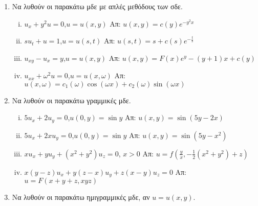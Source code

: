 


\thispagestyle{empty}



\begin{center}
\end{center}

\vspace{\baselineskip}

\begin{enumerate}
  \item Να λυθούν οι παρακάτω μδε με απλές μεθόδους των σδε.
    \begin{enumerate}[i)]
      \item $u_{x}+y^{2}u=0$,\quad $u=u(x,y)$ \hfill Απ: $u(x,y)=c(y)e^{-y^{2}x}$
      \item $su_{t}+u=1$,\quad $u=u(s,t)$ \hfill Απ: $u(s,t)=s+c(s)e^{-\frac{t}{s}}$
      \item $u_{xy}-u_{x}=y$,\quad $u=u(x,y)$ \hfill Απ: $u(x,y)=F(x)e^{y}-(y+1)x+c(y)$
      \item $u_{xx}+\omega^{2}u=0$,\quad $u=u(x,\omega)$ \hfill Απ: $u(x,\omega)=c_{1}(\omega)\cos(\omega x)+c_{2}(\omega)\sin(\omega x)$
    \end{enumerate}

\item Να λυθούν οι παρακάτω γραμμικές μδε.

  \begin{enumerate}[i)]
    \item $5u_{x}+2u_{y}=0$,\quad $u(0,y)=\sin y$  \hfill Απ: $u(x,y)=\sin(5y-2x)$
    \item $5u_{x}+2xu_{y}=0$,\quad $u(0,y)=\sin y$ \hfill Απ: $u(x,y)=\sin(5y-x^{2})$
    \item $xu_{x}+yu_{y}+(x^{2}+y^{2})u_{z}=0$, \quad $x>0$ \hfill Απ: $u=f(\frac{y}{x},-\frac{1}{2}(x^{2}+y^{2})+z)$
    \item $x(y-z)u_{x}+y(z-x)u_{y}+z(x-y)u_{z}=0$ \hfill Απ: $u=F(x+y+z,xyz)$
  \end{enumerate}

\item Να λυθούν οι παρακάτω ημιγραμμικές μδε, αν $u=u(x,y)$.


\end{enumerate}
